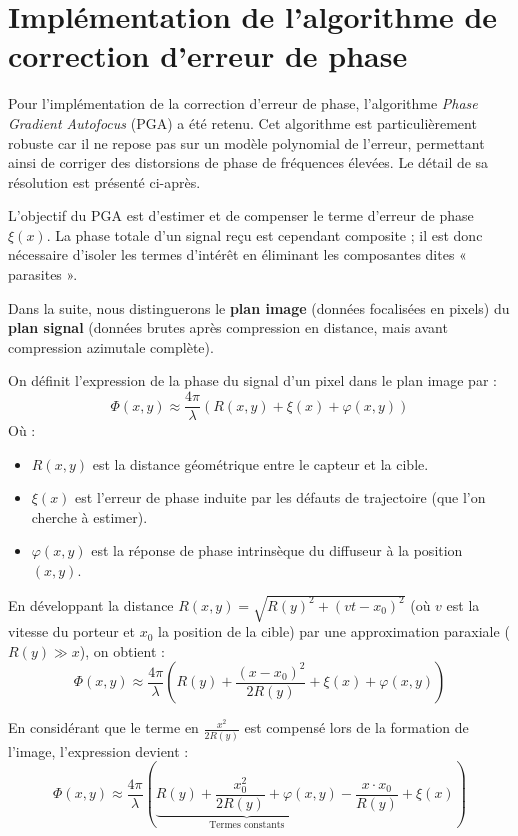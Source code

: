 \section{Implémentation de l'algorithme de correction d'erreur de phase}
\label{sec:choix_pga}

Pour l'implémentation de la correction d'erreur de phase, l'algorithme \textit{Phase Gradient Autofocus} (PGA) a été retenu. Cet algorithme est particulièrement robuste car il ne repose pas sur un modèle polynomial de l'erreur, permettant ainsi de corriger des distorsions de phase de fréquences élevées. Le détail de sa résolution est présenté ci-après.

L'objectif du PGA est d'estimer et de compenser le terme d'erreur de phase $\xi(x)$. La phase totale d'un signal reçu est cependant composite ; il est donc nécessaire d'isoler les termes d'intérêt en éliminant les composantes dites « parasites ». 

Dans la suite, nous distinguerons le \textbf{plan image} (données focalisées en pixels) du \textbf{plan signal} (données brutes après compression en distance, mais avant compression azimutale complète).

On définit l'expression de la phase du signal d'un pixel dans le plan image par :
\begin{equation}
\label{eq:phase}
    \Phi(x, y) \approx \frac{4 \pi}{\lambda} \left( R(x, y) + \xi(x) + \varphi(x, y) \right) 
\end{equation}
Où : 
\begin{itemize}
    \item $R(x, y)$ est la distance géométrique entre le capteur et la cible.
    \item $\xi(x)$ est l'erreur de phase induite par les défauts de trajectoire (que l'on cherche à estimer). 
    \item $\varphi(x, y)$ est la réponse de phase intrinsèque du diffuseur à la position $(x, y)$. 
\end{itemize}

En développant la distance $R(x, y) = \sqrt{R(y)^2 + (vt - x_0)^2}$ (où $v$ est la vitesse du porteur et $x_0$ la position de la cible) par une approximation paraxiale ($R(y) \gg x$), on obtient :
\begin{equation}
    \Phi(x, y) \approx \frac{4 \pi}{\lambda} \left( R(y) + \frac{(x - x_0)^2}{2R(y)} + \xi(x) + \varphi(x, y) \right)
\end{equation}

En considérant que le terme en $\frac{x^2}{2R(y)}$ est compensé lors de la formation de l'image, l'expression devient :
\begin{equation}
    \Phi(x, y) \approx \frac{4 \pi}{\lambda} \left( \underbrace{R(y) + \frac{x_0^2}{2R(y)} + \varphi(x, y)}_{\text{Termes constants}} - \frac{x \cdot x_0}{R(y)} + \xi(x) \right) 
\end{equation}

